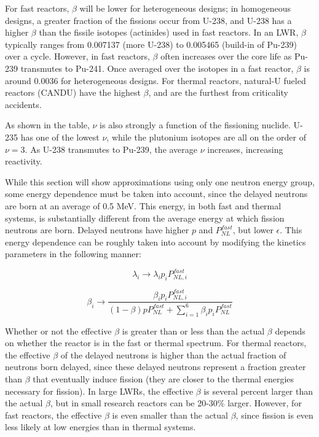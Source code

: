 \documentclass[10pt]{article}
\newcommand{\beq}{\begin{equation}}
\newcommand{\eeq}{\end{equation}}
\begin{document}
\begin{flushleft}
For fast reactors, \(\beta\) will be lower for heterogeneous designs; in homogeneous designs, a greater fraction of the fissions occur from U-238, and U-238 has a higher \(\beta\) than the fissile isotopes (actinides) used in fast reactors. In an LWR, \(\beta\) typically ranges from 0.007137 (more U-238) to 0.005465 (build-in of Pu-239) over a cycle. However, in fast reactors, \(\beta\) often increases over the core life as Pu-239 transmutes to Pu-241. Once averaged over the isotopes in a fast reactor, \(\beta\) is around 0.0036 for heterogeneous designs. For thermal reactors, natural-U fueled reactors (CANDU) have the highest \(\beta\), and are the furthest from criticality accidents. 

As shown in the table, \(\nu\) is also strongly a function of the fissioning nuclide. U-235 has one of the lowest \(\nu\), while the plutonium isotopes are all on the order of \(\nu=3\). As U-238 transmutes to Pu-239, the average \(\nu\) increases, increasing reactivity.

While this section will show approximations using only one neutron energy group, some energy dependence must be taken into account, since the delayed neutrons are born at an average of 0.5 MeV. This energy, in both fast and thermal systems, is substantially different from the average energy at which fission neutrons are born. Delayed neutrons have higher \(p\) and \(P_{NL}^{fast}\), but lower \(\epsilon\). This energy dependence can be roughly taken into account by modifying the kinetics parameters in the following manner:

\beq
\label{eq:ModifiedKineticsParameters_Lambda1}
\lambda_i \rightarrow \lambda_i p_i P_{NL,i}^{fast}
\eeq

\beq
\label{eq:ModifiedKineticsParameters_Beta2}
\beta_i \rightarrow \frac{\beta_i p_i P_{NL,i}^{fast}}{(1-\beta)pP_{NL}^{fast}+\sum_{i=1}^{6}\beta_i p_i P_{NL}^{fast}}
\eeq

Whether or not the effective \(\beta\) is greater than or less than the actual \(\beta\) depends on whether the reactor is in the fast or thermal spectrum. For thermal reactors, the effective \(\beta\) of the delayed neutrons is higher than the actual fraction of neutrons born delayed, since these delayed neutrons represent a fraction greater than \(\beta\) that eventually induce fission (they are closer to the thermal energies necessary for fission). In large LWRs, the effective \(\beta\) is several percent larger than the actual \(\beta\), but in small research reactors can be 20-30\% larger. However, for fast reactors, the effective \(\beta\) is even smaller than the actual \(\beta\), since fission is even less likely at low energies than in thermal systems. 


\end{flushleft}
\end{document}
